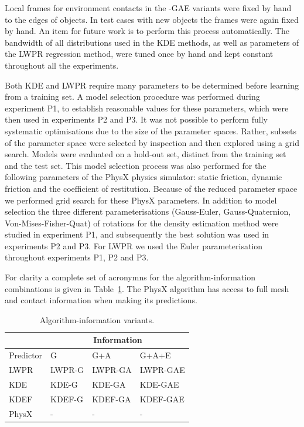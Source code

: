 Local frames for environment contacts in the -GAE variants were fixed
by hand to the edges of objects. In test cases with new objects the
frames were again fixed by hand.  An item for future work is to
perform this process automatically.  The bandwidth of all
distributions used in the KDE methods, as well as parameters of the
LWPR regression method, were tuned once by hand and kept constant
throughout all the experiments.

Both KDE and LWPR require many parameters to be determined before
learning from a training set.  A model selection procedure was
performed during experiment P1, to establish reasonable values for
these parameters, which were then used in experiments P2 and P3.  It was
not possible to perform fully systematic optimisations due to the size
of the parameter spaces.  Rather, subsets of the parameter space were
selected by inspection and then explored using a grid search.  Models
were evaluated on a hold-out set, distinct from the training set and
the test set. This model selection process was also performed for the
following parameters of the PhysX physics simulator: static friction,
dynamic friction and the coefficient of restitution. Because of the
reduced parameter space we performed grid search for these PhysX
parameters. In addition to model selection the three different
parameterisations (Gauss-Euler, Gauss-Quaternion,
Von-Mises-Fisher-Quat) of rotations for the density estimation method
were studied in experiment P1, and subsequently the best solution was
used in experiments P2 and P3. For LWPR we used the Euler
parameterisation throughout experiments P1, P2 and P3.

For clarity a complete set of acronymns for the algorithm-information
combinations is given in Table~\ref{tab:algs}. The PhysX algorithm has
access to full mesh and contact information when making its
predictions.

\begin{table}[b]
\begin{center}
\begin{tabular}{|l|l|l|l|}\hline
 & \multicolumn{3}{|c|}{Information} \\ \hline
Predictor & G & G+A & G+A+E \\ \hline
LWPR & LWPR-G& LWPR-GA & LWPR-GAE \\ \hline
KDE & KDE-G & KDE-GA & KDE-GAE \\ \hline
KDEF & KDEF-G & KDEF-GA & KDEF-GAE \\ \hline
PhysX & - & - & - \\ \hline
\end{tabular}
\end{center}
\caption{Algorithm-information variants.}
\label{tab:algs}
\end{table}


